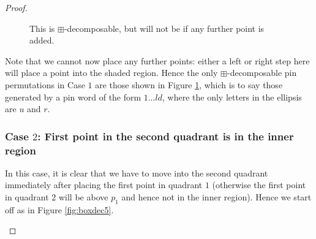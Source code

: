 \documentclass[11pt,a4paper]{article}
\theoremstyle{definition}
\begin{document}
\begin{proof}
\begin{figure}[h]
\begin{center}
\end{center}
\caption{This is $\boxplus$-decomposable, but will not be if any further point is added.}
\label{fig:boxdec4}
\end{figure}

Note that we cannot now place any further points: either a left or right step here will place a point into the shaded region. Hence the only $\boxplus$-decomposable pin permutations in Case $1$ are those shown in Figure \ref{fig:boxdec4}, which is to say those generated by a pin word of the form $1 \dots ld$, where the only letters in the ellipsis are $u$ and $r$.

\subsubsection*{Case $2$: First point in the second quadrant is in the inner region}

In this case, it is clear that we have to move into the second quadrant immediately after placing the first point in quadrant $1$ (otherwise the first point in quadrant $2$ will be above $p_{1}$ and hence not in the inner region). Hence we start off as in Figure \ref{fig:boxdec5}.

\begin{figure}[h]
\begin{center}
\end{center}
\end{figure}
\end{proof}
\end{document}
